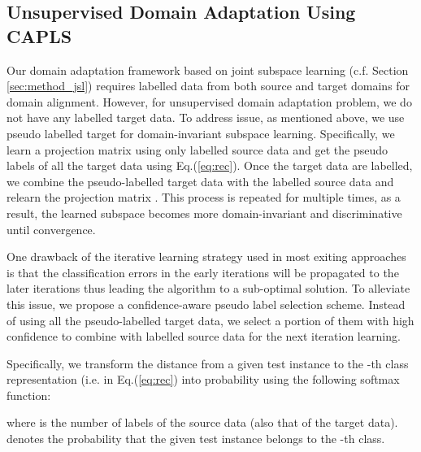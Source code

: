 \documentclass[conference]{IEEEtran}
\begin{document}
\subsection{Unsupervised Domain Adaptation Using CAPLS}\label{sec:method_uda}
Our domain adaptation framework based on joint subspace learning (c.f. Section \ref{sec:method_jsl}) requires labelled data from both source and target domains for domain alignment. However, for unsupervised domain adaptation problem, we do not have any labelled target data. To address issue, as mentioned above, we use pseudo labelled target for domain-invariant subspace learning. Specifically, we learn a projection matrix  using only labelled source data and get the pseudo labels of all the target data using Eq.(\ref{eq:rec}). Once the target data are labelled, we combine the pseudo-labelled target data with the labelled source data and relearn the projection matrix . This process is repeated for multiple times, as a result, the learned subspace becomes more domain-invariant and discriminative until convergence. 

One drawback of the iterative learning strategy used in most exiting approaches is that the classification errors in the early iterations will be propagated to the later iterations thus leading the algorithm to a sub-optimal solution. To alleviate this issue, we propose a confidence-aware pseudo label selection scheme. Instead of using all the pseudo-labelled target data, we select a portion of them with high confidence to combine with labelled source data for the next iteration learning.

Specifically, we transform the distance from a given test instance  to the -th class representation  (i.e.   in Eq.(\ref{eq:rec}) into probability  using the following softmax function:

where  is the number of labels of the source data (also that of the target data).  denotes the probability that the given test instance belongs to the -th class. 
\end{document}
